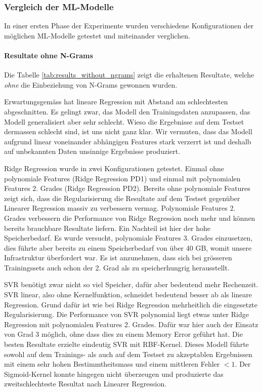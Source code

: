\documentclass[10pt, a4paper]{article}
\begin{document}
\subsubsection{Vergleich der ML-Modelle} \label{sec:ml_results_models}
In einer ersten Phase der Experimente wurden verschiedene Konfigurationen der möglichen \ac{ML}-Modelle getestet und miteinander verglichen.

\paragraph{Resultate ohne N-Grams}
Die Tabelle \ref{tab:results_without_ngrams} zeigt die erhaltenen Resultate, welche \emph{ohne} die Einbeziehung von N-Grams gewonnen wurden.

Erwartungsgemäss hat lineare Regression mit Abstand am schlechtesten abgeschnitten. Es gelingt zwar, das Modell den Trainingsdaten anzupassen, das Modell generalisiert aber sehr schlecht. Wieso die Ergebnisse auf dem Testset dermassen schlecht sind, ist uns nicht ganz klar. Wir vermuten, dass das Modell aufgrund linear voneinander abhängigen Features stark verzerrt ist und deshalb auf unbekannten Daten unsinnige Ergebnisse produziert.

Ridge Regression wurde in zwei Konfigurationen getestet. Einmal ohne polynomiale Features (Ridge Regression PD1) und einmal mit polynomialen Features 2. Grades (Ridge Regression PD2). Bereits ohne polynomiale Features zeigt sich, dass die Regularisierung die Resultate auf dem Testset gegenüber Linearer Regression massiv zu verbessern vermag. Polynomiale Features 2. Grades verbessern die Performance von Ridge Regression noch mehr und können bereits brauchbare Resultate liefern. Ein Nachteil ist hier der hohe Speicherbedarf. Es wurde versucht, polynomiale Features 3. Grades einzusetzen, dies führte aber bereits zu einem Speicherbedarf von über 40 GB, womit unsere Infrastruktur überfordert war. Es ist anzunehmen, dass sich bei grösseren Trainingssets auch schon der 2. Grad als zu speicherhungrig herausstellt.

SVR benötigt zwar nicht so viel Speicher, dafür aber bedeutend mehr Rechenzeit. SVR linear, also ohne Kernelfunktion, schneidet bedeutend besser ab als lineare Regression. Grund dafür ist wie bei Ridge Regression mehrheitlich die eingesetzte Regularisierung. Die Performance von SVR polynomial liegt etwas unter Ridge Regression mit polynomialen Features 2. Grades. Dafür war hier auch der Einsatz von Grad 3 möglich, ohne dass dies zu einem Memory Error geführt hat. Die besten Resultate erzielte eindeutig SVR mit \ac{RBF}-Kernel. Dieses Modell führte sowohl auf dem Trainings- als auch auf dem Testset zu akzeptablen Ergebnissen mit einem sehr hohen Bestimmtheitsmass und einem mittleren Fehler \(<1\). Der Sigmoid-Kernel konnte hingegen nicht überzeugen und produzierte das zweitschlechteste Resultat nach Linearer Regression.
\end{document}
